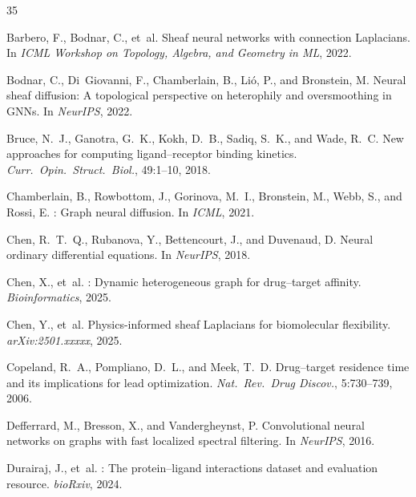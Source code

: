 \documentclass{article}
\begin{document}
\begin{thebibliography}{35}

Barbero, F., Bodnar, C., et~al.
\newblock Sheaf neural networks with connection Laplacians.
\newblock In \emph{ICML Workshop on Topology, Algebra, and Geometry in ML}, 2022.

Bodnar, C., Di~Giovanni, F., Chamberlain, B., Li\'o, P., and Bronstein, M.
\newblock Neural sheaf diffusion: A topological perspective on heterophily and oversmoothing in {GNN}s.
\newblock In \emph{NeurIPS}, 2022.

Bruce, N.~J., Ganotra, G.~K., Kokh, D.~B., Sadiq, S.~K., and Wade, R.~C.
\newblock New approaches for computing ligand--receptor binding kinetics.
\newblock \emph{Curr.\ Opin.\ Struct.\ Biol.}, 49:1--10, 2018.

Chamberlain, B., Rowbottom, J., Gorinova, M.~I., Bronstein, M., Webb, S., and Rossi, E.
: Graph neural diffusion.
\newblock In \emph{ICML}, 2021.

Chen, R.~T.~Q., Rubanova, Y., Bettencourt, J., and Duvenaud, D.
\newblock Neural ordinary differential equations.
\newblock In \emph{NeurIPS}, 2018.

Chen, X., et~al.
: Dynamic heterogeneous graph for drug--target affinity.
\newblock \emph{Bioinformatics}, 2025.

Chen, Y., et~al.
\newblock Physics-informed sheaf {L}aplacians for biomolecular flexibility.
\newblock \emph{arXiv:2501.xxxxx}, 2025.

Copeland, R.~A., Pompliano, D.~L., and Meek, T.~D.
\newblock Drug--target residence time and its implications for lead optimization.
\newblock \emph{Nat.\ Rev.\ Drug Discov.}, 5:730--739, 2006.

Defferrard, M., Bresson, X., and Vandergheynst, P.
\newblock Convolutional neural networks on graphs with fast localized spectral filtering.
\newblock In \emph{NeurIPS}, 2016.

Durairaj, J., et~al.
: The protein--ligand interactions dataset and evaluation resource.
\newblock \emph{bioRxiv}, 2024.


\end{thebibliography}
\end{document}
